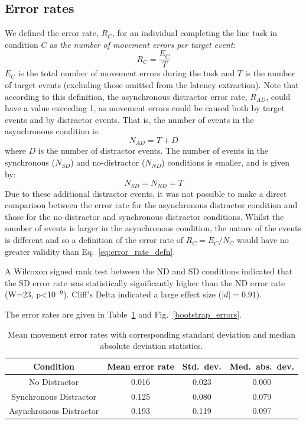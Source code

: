 \documentclass[10pt,letterpaper]{article}
\begin{document}
\subsection*{Error rates}

We defined the error rate, $R_{C}$, for an individual completing
the line task in condition $C$ as \emph{the number of movement errors
  per target event}:
%
\begin{equation}\label{eq:error_rate_defn}
R_{C} = \frac{E_{C}}{T}
\end{equation}
%
$E_{C}$ is the total number of movement errors during the task
and $T$ is the number of target events (excluding those
omitted from the latency extraction).
%
Note that according to this definition, the asynchronous distractor
error rate, $R_{AD}$, could have a value exceeding 1, as movement
errors could be caused both by target events and by distractor
events. That is, the number of events in the asynchronous condition is:
%
\begin{equation}\label{eq:num_events_async}
N_{AD} = T + D
\end{equation}
%
where $D$ is the number of distractor events. The number of events in
the synchronous ($N_{SD}$) and no-distractor ($N_{ND}$) conditions is
smaller, and is given by:
%
\begin{equation}\label{eq:num_events_sync}
N_{SD} = N_{ND} = T
\end{equation}
%
Due to these additional distractor events, it was not possible to make
a direct comparison between the error rate for the asynchronous
distractor condition and those for the no-distractor and synchronous
distractor conditions. Whilst the number of events is larger in the
asynchronous condition, the nature of the events is different and so a
definition of the error rate of $R_{C} = {E_C}/{N_C}$ would have
no greater validity than Eq.~\ref{eq:error_rate_defn}.

A Wilcoxon signed
rank test between the ND and SD conditions indicated that the SD error
rate was statistically significantly higher than the ND error rate
(W=23, p\textless10$^{-9}$). Cliff's Delta indicated a large effect
size ($|d|=0.91$).

The error rates are given in Table~\ref{table:error_rates} and
Fig.~\ref{bootstrap_errors}.

\begin{table}[ht]
\caption{Mean movement error rates with corresponding standard
  deviation and median absolute deviation statistics.}
\centering
\begin{tabular}{c c c c}
\hline
\textbf{Condition} & \textbf{Mean error rate} & \textbf{Std.~dev.} & \textbf{Med.~abs.~dev.} \\ [0.5ex]
\hline
No Distractor & 0.016 & 0.023 & 0.000 \\
Synchronous Distractor & 0.125 & 0.080 & 0.079 \\
Asynchronous Distractor & 0.193 & 0.119 & 0.097 \\ [1ex]
\hline
\end{tabular}
\label{table:error_rates}
\end{table}
\end{document}
